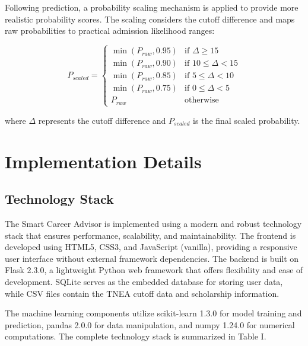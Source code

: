 \documentclass[journal]{IEEEtran}
\begin{document}
Following prediction, a probability scaling mechanism is applied to provide more realistic probability scores. The scaling considers the cutoff difference and maps raw probabilities to practical admission likelihood ranges:

\[
P_{scaled} = 
\begin{cases}
\min(P_{raw}, 0.95) & \text{if } \Delta \geq 15 \\
\min(P_{raw}, 0.90) & \text{if } 10 \leq \Delta < 15 \\
\min(P_{raw}, 0.85) & \text{if } 5 \leq \Delta < 10 \\
\min(P_{raw}, 0.75) & \text{if } 0 \leq \Delta < 5 \\
P_{raw} & \text{otherwise}
\end{cases}
\]

where $\Delta$ represents the cutoff difference and $P_{scaled}$ is the final scaled probability.

\section{Implementation Details}

\subsection{Technology Stack}
The Smart Career Advisor is implemented using a modern and robust technology stack that ensures performance, scalability, and maintainability. The frontend is developed using HTML5, CSS3, and JavaScript (vanilla), providing a responsive user interface without external framework dependencies. The backend is built on Flask 2.3.0, a lightweight Python web framework that offers flexibility and ease of development. SQLite serves as the embedded database for storing user data, while CSV files contain the TNEA cutoff data and scholarship information.

The machine learning components utilize scikit-learn 1.3.0 for model training and prediction, pandas 2.0.0 for data manipulation, and numpy 1.24.0 for numerical computations. The complete technology stack is summarized in Table I.
\end{document}

